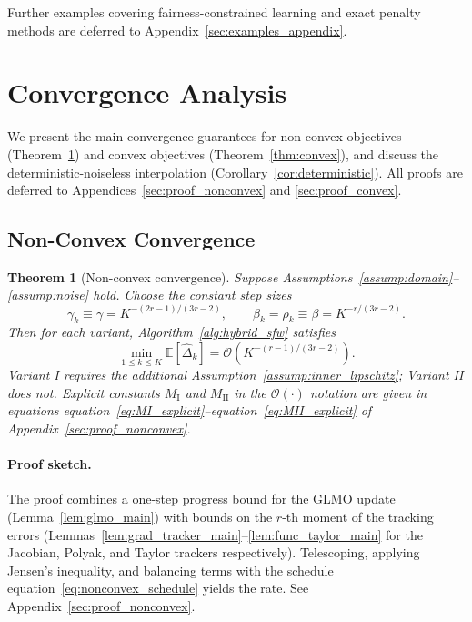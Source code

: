 \documentclass{article}
\def\eqref#1{equation~\ref{#1}}
\newcommand{\E}{\mathbb{E}}
\newtheorem{theorem}{Theorem}
\begin{document}
Further examples covering fairness-constrained learning \citep{agarwal2018reductions, donini2018empirical} and exact penalty methods \citep{cotter2019two} are deferred to Appendix~\ref{sec:examples_appendix}.

\section{Convergence Analysis}

We present the main convergence guarantees for non-convex objectives (Theorem~\ref{thm:nonconvex}) and convex objectives (Theorem~\ref{thm:convex}), and discuss the deterministic-noiseless interpolation (Corollary~\ref{cor:deterministic}). All proofs are deferred to Appendices~\ref{sec:proof_nonconvex} and \ref{sec:proof_convex}.

\subsection{Non-Convex Convergence}

\begin{theorem}[Non-convex convergence] \label{thm:nonconvex}
Suppose Assumptions~\ref{assump:domain}--\ref{assump:noise} hold. Choose the constant step sizes
\begin{equation}\label{eq:nonconvex_schedule}
\gamma_k \equiv \gamma = K^{-(2r-1)/(3r-2)}, \qquad \beta_k = \rho_k \equiv \beta = K^{-r/(3r-2)}.
\end{equation}
Then for each variant, Algorithm~\ref{alg:hybrid_sfw} satisfies
\[
\min_{1 \le k \le K} \E[\hat\Delta_k] = \mathcal{O}\!\left(K^{-(r-1)/(3r-2)}\right).
\]
Variant I requires the additional Assumption~\ref{assump:inner_lipschitz}; Variant II does not. Explicit constants $M_{\mathrm{I}}$ and $M_{\mathrm{II}}$ in the $\mathcal{O}(\cdot)$ notation are given in equations \eqref{eq:MI_explicit}--\eqref{eq:MII_explicit} of Appendix~\ref{sec:proof_nonconvex}.
\end{theorem}

\paragraph{Proof sketch.} The proof combines a one-step progress bound for the GLMO update (Lemma~\ref{lem:glmo_main}) with bounds on the $r$-th moment of the tracking errors (Lemmas~\ref{lem:grad_tracker_main}--\ref{lem:func_taylor_main} for the Jacobian, Polyak, and Taylor trackers respectively). Telescoping, applying Jensen's inequality, and balancing terms with the schedule \eqref{eq:nonconvex_schedule} yields the rate. See Appendix~\ref{sec:proof_nonconvex}.
\end{document}
